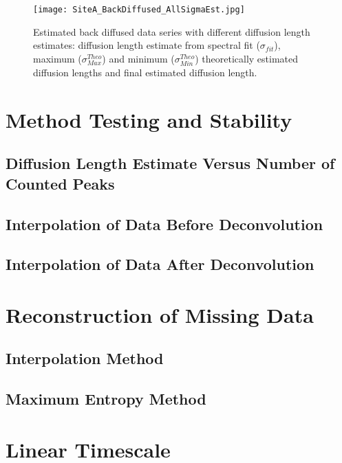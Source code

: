 \documentclass[../../CompleteThesis/Complete_1stDraft.tex]{subfiles}
\begin{document}
\begin{figure}
	\centering
	\texttt{[image: SiteA\_BackDiffused\_AllSigmaEst.jpg]}
	\caption[All diffusion length estimate deconvolutions, Site A]{Estimated back diffused data series with different diffusion length estimates: diffusion length estimate from spectral fit ($\sigma_{fit}$), maximum ($\sigma_{Max}^{Theo}$) and minimum ($\sigma_{Min}^{Theo}$) theoretically estimated diffusion lengths and final estimated diffusion length.}
	\label{fig:SiteA_BackDiffused_AllSigmaEst}
\end{figure}

\section[Stability Tests]{Method Testing and Stability}
\subsection[Maximal $N_{\text{peaks}}$]{Diffusion Length Estimate Versus Number of Counted Peaks}
\subsection[Interpolation 1]{Interpolation of Data Before Deconvolution}
\subsection[Interpolation 2]{Interpolation of Data After Deconvolution}


\section[Missing Data]{Reconstruction of Missing Data}
\subsection[Interpolation Method]{Interpolation Method}
\subsection[MEM]{Maximum Entropy Method}

\section[Linear Timescale]{Linear Timescale}
\end{document}
